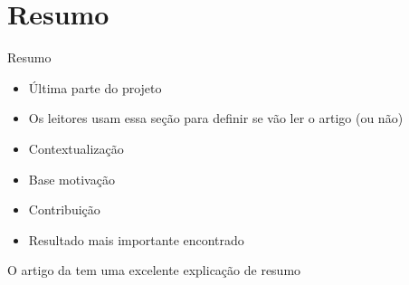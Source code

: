 \section{Resumo}

\begin{frame}	
	\begin{block}{Resumo}
		 \begin{itemize}
			  \item Última parte do projeto			  
			  \item Os leitores usam essa seção para definir se vão ler o artigo (ou não)
			  \item Contextualização
			  \item Base motivação
			  \item Contribuição
			  \item Resultado mais importante encontrado
		  \end{itemize}
	\end{block}
	O artigo da  \href{https://www.nature.com/scitable/topicpage/scientific-papers-13815490}{\color{blue}{Nature}}  tem uma excelente explicação de resumo 
\end{frame}
